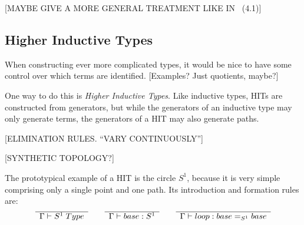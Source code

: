 [MAYBE GIVE A MORE GENERAL TREATMENT LIKE IN~\cite{Rijke2019} (4.1)]

\subsection{Higher Inductive Types}

When constructing ever more complicated types, it would be nice to have some
control over which terms are identified. [Examples? Just quotients, maybe?]

One way to do this is \emph{Higher Inductive Types}. Like inductive types, HITs
are constructed from generators, but while the generators of an inductive type
may only generate terms, the generators of a HIT may also generate paths.

[ELIMINATION RULES. ``VARY CONTINUOUSLY'']

[SYNTHETIC TOPOLOGY?]

The prototypical example of a HIT is the circle $S^1$, because it is very simple
comprising only a single point and one path. Its introduction and formation
rules are:
\begin{equation}
  \label{eq:circle}
  \begin{array}[t]{c}
    \hline
    \Gamma \vdash S^1 \; Type\\
  \end{array}
  \qquad
  \begin{array}[t]{c}
    \hline
    \Gamma \vdash base : S^1\\
  \end{array}
  \qquad
  \begin{array}[t]{c}
    \hline
    \Gamma \vdash loop : base =_{S^1} base
  \end{array}
\end{equation}